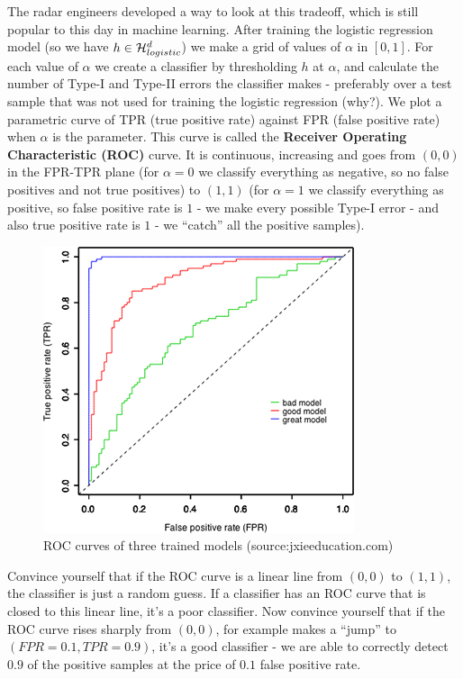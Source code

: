 	The radar engineers developed a way to look at this tradeoff, which is
	still popular to this day in machine learning. After training the
	logistic regression model (so we have $h\in\mathcal{H}_{logistic}^d$)  we make a grid of values of $\alpha$ in
	$[0,1]$. For each value of $\alpha$ we create a classifier by thresholding  $h$ at
	$\alpha$, and calculate the number of  Type-I and Type-II errors the
	classifier makes - preferably over a test sample that was not used for
	training the logistic regression (why?).  We plot a parametric curve of TPR (true
	positive rate) against FPR (false positive rate) when $\alpha$ is the
	parameter. This curve is called the {\bf Receiver Operating
	Characteristic (ROC)} curve. It is continuous, increasing and goes from
	$(0,0)$ in the FPR-TPR plane 
	(for $\alpha=0$ we classify everything as negative, so no false
	positives and not true positives) to $(1,1)$ (for $\alpha=1$ we
	  classify everything as positive, so false positive rate is $1$ - we
	  make every possible Type-I error - and
	  also true positive rate is $1$ - we ``catch'' all the positive
	samples).

	\begin{figure}[h!]
	  \centering
	  \includegraphics{roc.png}
	  \caption{ROC curves of three trained models (source:jxieeducation.com)}
	\end{figure}

	Convince yourself that if the ROC curve is a linear line from $(0,0)$ to
	$(1,1)$, the classifier is just a random guess. If a classifier has an
	ROC curve that is closed to this linear line, it's a poor classifier.
	Now convince yourself that if the ROC curve rises sharply from $(0,0)$,
	for example makes a ``jump'' to $(FPR=0.1, TPR=0.9)$, it's a good
	classifier - we are able to correctly detect $0.9$ of the positive
	samples at the price of $0.1$ false positive rate. 

